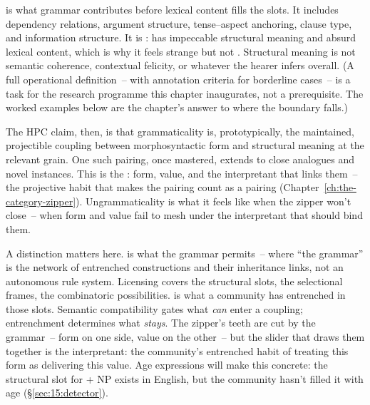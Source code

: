  is what grammar contributes before lexical content fills the slots. It includes dependency relations, argument structure, tense--aspect anchoring, clause type, and information structure. It is :  has impeccable structural meaning and absurd lexical content, which is why it feels strange but not . Structural meaning is not semantic coherence, contextual felicity, or whatever the hearer infers overall. (A full operational definition~-- with annotation criteria for borderline cases~-- is a task for the research programme this chapter inaugurates, not a prerequisite. The worked examples below are the chapter's answer to where the boundary falls.)

The HPC claim, then, is that grammaticality is, prototypically, the maintained, projectible coupling between morphosyntactic form and structural meaning at the relevant grain. One such pairing, once mastered, extends to close analogues and novel instances. This is the : form, value, and the interpretant that links them~-- the projective habit that makes the pairing count as a pairing (Chapter~\ref{ch:the-category-zipper}). Ungrammaticality is what it feels like when the zipper won't close~-- when form and value fail to mesh under the interpretant that should bind them.

A distinction matters here.  is what the grammar permits~-- where \enquote{the grammar} is the network of entrenched constructions and their inheritance links, not an autonomous rule system. Licensing covers the structural slots, the selectional frames, the combinatoric possibilities.  is what a community has entrenched in those slots. Semantic compatibility gates what \emph{can} enter a coupling; entrenchment determines what \emph{stays}. The zipper's teeth are cut by the grammar~-- form on one side, value on the other~-- but the slider that draws them together is the interpretant: the community's entrenched habit of treating this form as delivering this value. Age expressions will make this concrete: the structural slot for  + NP exists in English, but the community hasn't filled it with age (§\ref{sec:15:detector}).

